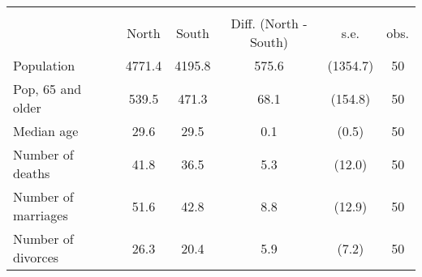 {
\def\sym#1{\ifmmode^{#1}\else\(^{#1}\)\fi}
\begin{tabular}{l*{1}{ccccc}}
\toprule
                &\multicolumn{5}{c}{}                                      \\
                &    North&    South&Diff. (North - South)         &     s.e.&     obs.\\
\midrule
\hspace{0.25cm} Population&   4771.4&   4195.8&    575.6         & (1354.7)&       50\\
\addlinespace
\hspace{0.25cm} Pop, 65 and older&    539.5&    471.3&     68.1         &  (154.8)&       50\\
\addlinespace
\hspace{0.25cm} Median age&     29.6&     29.5&      0.1         &    (0.5)&       50\\
\addlinespace
\hspace{0.25cm} Number of deaths&     41.8&     36.5&      5.3         &   (12.0)&       50\\
\addlinespace
\hspace{0.25cm} Number of marriages&     51.6&     42.8&      8.8         &   (12.9)&       50\\
\addlinespace
\hspace{0.25cm} Number of divorces&     26.3&     20.4&      5.9         &    (7.2)&       50\\
\bottomrule
\end{tabular}
}
